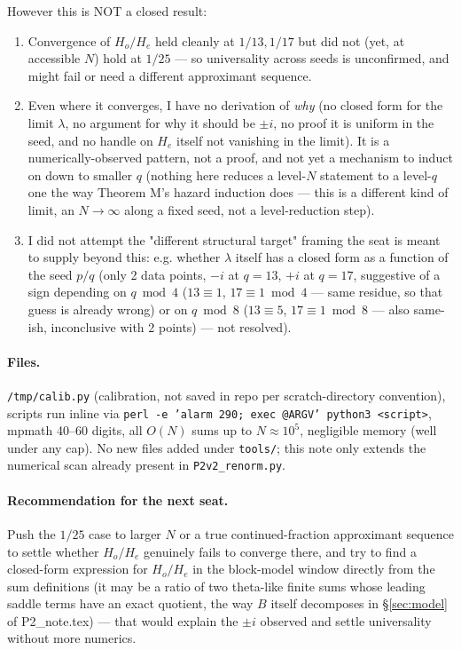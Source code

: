 \documentclass[11pt]{article}
\begin{document}
However this is NOT a closed result:
\begin{enumerate}
\item Convergence of $H_o/H_e$ held cleanly at $1/13,1/17$ but did not (yet, at accessible $N$) hold at $1/25$ — so
universality across seeds is unconfirmed, and might fail or need a different approximant sequence.
\item Even where it converges, I have no derivation of \emph{why} (no closed form for the limit $\lambda$, no argument for
why it should be $\pm i$, no proof it is uniform in the seed, and no handle on $H_e$ itself not vanishing in the limit).
It is a numerically-observed pattern, not a proof, and not yet a mechanism to induct on down to smaller $q$ (nothing
here reduces a level-$N$ statement to a level-$q$ one the way Theorem M's hazard induction does — this is a different
kind of limit, an $N\to\infty$ along a fixed seed, not a level-reduction step).
\item I did not attempt the "different structural target" framing the seat is meant to supply beyond this: e.g. whether
$\lambda$ itself has a closed form as a function of the seed $p/q$ (only 2 data points, $-i$ at $q=13$, $+i$ at $q=17$,
suggestive of a sign depending on $q\bmod4$ ($13\equiv1$, $17\equiv1\bmod4$ — same residue, so that guess is already
wrong) or on $q\bmod8$ ($13\equiv5$, $17\equiv1\bmod8$ — also same-ish, inconclusive with 2 points) — not resolved).
\end{enumerate}

\paragraph{Files.} \texttt{/tmp/calib.py} (calibration, not saved in repo per scratch-directory convention),
scripts run inline via \texttt{perl -e 'alarm 290; exec @ARGV' python3 <script>}, mpmath 40--60 digits, all $O(N)$ sums up
to $N\approx10^5$, negligible memory (well under any cap). No new files added under \texttt{tools/}; this note only
extends the numerical scan already present in \texttt{P2v2\_renorm.py}.

\paragraph{Recommendation for the next seat.} Push the $1/25$ case to larger $N$ or a true continued-fraction approximant
sequence to settle whether $H_o/H_e$ genuinely fails to converge there, and try to find a closed-form expression for
$H_o/H_e$ in the block-model window directly from the sum definitions (it may be a ratio of two theta-like finite sums
whose leading saddle terms have an exact quotient, the way $B$ itself decomposes in \S\ref{sec:model} of P2\_note.tex) — that
would explain the $\pm i$ observed and settle universality without more numerics.
\end{document}
